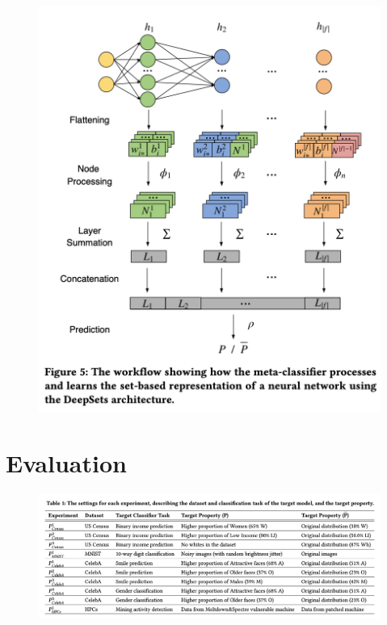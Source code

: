 \documentclass[11pt]{article}
\numberwithin{equation}{section}
\begin{document}
\begin{figure}[!h]
	\centering
	\includegraphics[width=12cm]{figures/Set_model.png}
	\label{fig:property inference model}
\end{figure}


\section{Evaluation}

\begin{figure}[H]
	\centering
	\includegraphics[width=15cm]{figures/Data_setup.png}
	\label{fig:property inference model}
\end{figure}
\end{document}
